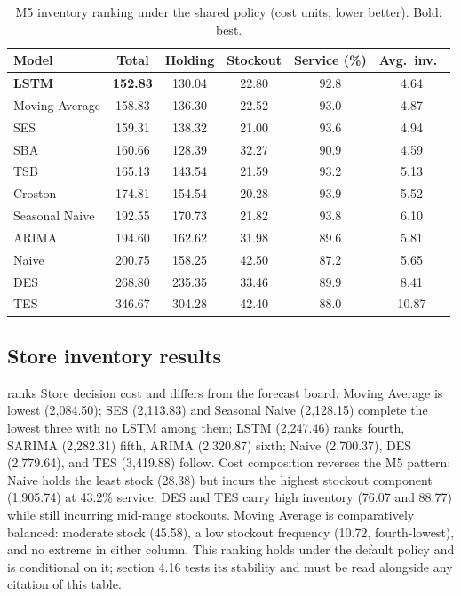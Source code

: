 \begin{table}[H]
\centering
\caption{M5 inventory ranking under the shared policy (cost units; lower better). Bold: best.}
\label{tab:m5inv}
\begin{tabular}{lccccc}
\toprule
Model & Total & Holding & Stockout & Service (\%) & Avg.\ inv.\ \\
\midrule
\textbf{LSTM} & \textbf{152.83} & 130.04 & 22.80 & 92.8 & 4.64 \\
Moving Average & 158.83 & 136.30 & 22.52 & 93.0 & 4.87 \\
SES & 159.31 & 138.32 & 21.00 & 93.6 & 4.94 \\
SBA & 160.66 & 128.39 & 32.27 & 90.9 & 4.59 \\
TSB & 165.13 & 143.54 & 21.59 & 93.2 & 5.13 \\
Croston & 174.81 & 154.54 & 20.28 & 93.9 & 5.52 \\
Seasonal Naive & 192.55 & 170.73 & 21.82 & 93.8 & 6.10 \\
ARIMA & 194.60 & 162.62 & 31.98 & 89.6 & 5.81 \\
Naive & 200.75 & 158.25 & 42.50 & 87.2 & 5.65 \\
DES & 268.80 & 235.35 & 33.46 & 89.9 & 8.41 \\
TES & 346.67 & 304.28 & 42.40 & 88.0 & 10.87 \\
\bottomrule
\end{tabular}
\end{table}

\subsection{Store inventory results}
\label{sec:store-inv}
 ranks Store decision cost and differs from the forecast
board. Moving Average is lowest (2,084.50); SES (2,113.83) and Seasonal Naive
(2,128.15) complete the lowest three with no LSTM among them; LSTM (2,247.46)
ranks fourth, SARIMA (2,282.31) fifth, ARIMA (2,320.87) sixth; Naive
(2,700.37), DES (2,779.64), and TES (3,419.88) follow. Cost composition
reverses the M5 pattern: Naive holds the least stock (28.38) but incurs the
highest stockout component (1,905.74) at 43.2\% service; DES and TES carry
high inventory (76.07 and 88.77) while still incurring mid-range stockouts.
Moving Average is comparatively balanced: moderate stock (45.58), a low
stockout frequency (10.72, fourth-lowest), and no extreme in either column. This ranking
holds under the default policy and is conditional on it; section 4.16
tests its stability and must be read alongside any citation of this table.

